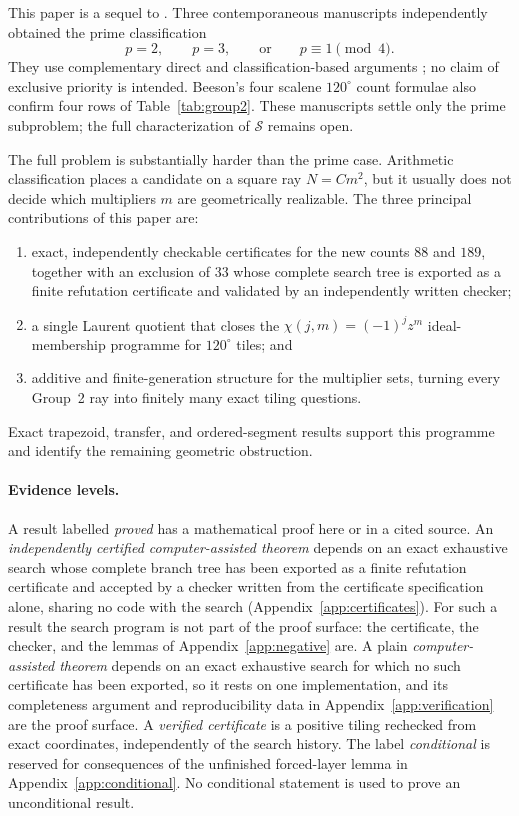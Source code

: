 \documentclass[11pt]{amsart}
\theoremstyle{definition}
\theoremstyle{remark}
\newcommand{\Sset}{\mathcal S}
\begin{document}
This paper is a sequel to \cite{HarriesPrime}.  Three contemporaneous
manuscripts independently obtained the prime classification
\[
             p=2,\qquad p=3,\qquad\text{or}\qquad p\equiv1\pmod4.
\]
They use complementary direct and classification-based arguments
\cite{GeorgePrime,HarriesPrime,BeesonAllPrime,BeesonPrime}; no claim of
exclusive priority is intended.  Beeson's four scalene $120^\circ$ count
formulae also confirm four rows of Table~\ref{tab:group2}.  These manuscripts
settle only the prime subproblem; the full characterization of $\Sset$ remains
open.

The full problem is substantially harder than the prime case.  Arithmetic
classification places a candidate on a square ray $N=Cm^2$, but it usually
does not decide which multipliers $m$ are geometrically realizable.  The three
principal contributions of this paper are:
\begin{enumerate}[leftmargin=2.2em]
\item exact, independently checkable certificates for the new counts $88$
      and $189$, together with an exclusion of $33$ whose complete search
      tree is exported as a finite refutation certificate and validated by
      an independently written checker;
\item a single Laurent quotient that closes the
      $\chi(j,m)=(-1)^jz^m$ ideal-membership programme for $120^\circ$ tiles;
      and
\item additive and finite-generation structure for the multiplier sets,
      turning every Group~2 ray into finitely many exact tiling questions.
\end{enumerate}
Exact trapezoid, transfer, and ordered-segment results support this programme
and identify the remaining geometric obstruction.

\paragraph{Evidence levels.}
A result labelled \emph{proved} has a mathematical proof here or in a cited
source.  An \emph{independently certified computer-assisted theorem} depends
on an exact exhaustive search whose complete branch tree has been exported as
a finite refutation certificate and accepted by a checker written from the
certificate specification alone, sharing no code with the search
(Appendix~\ref{app:certificates}).  For such a result the search program is
not part of the proof surface: the certificate, the checker, and the lemmas
of Appendix~\ref{app:negative} are.  A plain \emph{computer-assisted theorem}
depends on an exact exhaustive search for which no such certificate has been
exported, so it rests on one implementation, and its completeness argument
and reproducibility data in Appendix~\ref{app:verification} are the proof
surface.  A \emph{verified certificate} is a positive tiling rechecked from
exact coordinates, independently of the search history.  The label
\emph{conditional} is reserved for consequences of the unfinished
forced-layer lemma in Appendix~\ref{app:conditional}.  No conditional
statement is used to prove an unconditional result.
\end{document}
